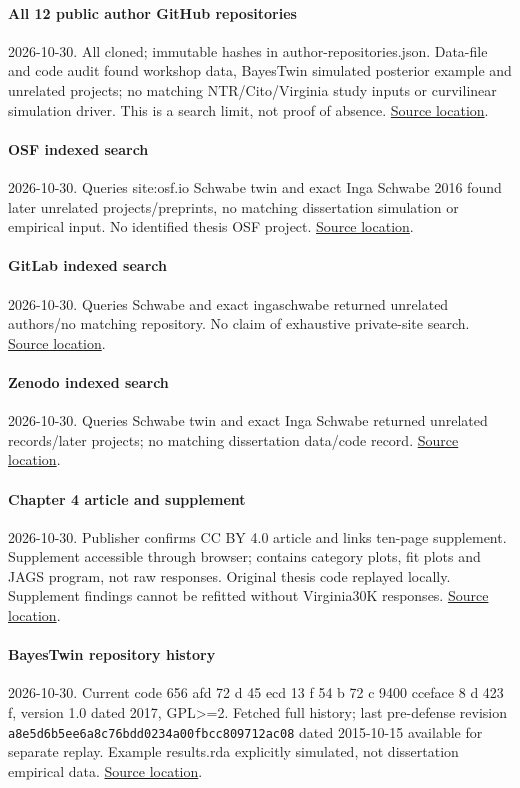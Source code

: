 \documentclass[11pt]{article}
\begin{document}
\paragraph{All 12 public author GitHub repositories} 2026-10-30. All cloned; immutable hashes in author-repositories.json. Data-file and code audit found workshop data, BayesTwin simulated posterior example and unrelated projects; no matching NTR/Cito/Virginia study inputs or curvilinear simulation driver. This is a search limit, not proof of absence. \href{https://github.com/ingaschwabe}{Source location}.
\paragraph{OSF indexed search} 2026-10-30. Queries site:osf.io Schwabe twin and exact Inga Schwabe 2016 found later unrelated projects/preprints, no matching dissertation simulation or empirical input. No identified thesis OSF project. \href{https://osf.io/}{Source location}.
\paragraph{GitLab indexed search} 2026-10-30. Queries Schwabe and exact ingaschwabe returned unrelated authors/no matching repository. No claim of exhaustive private-site search. \href{https://gitlab.com/}{Source location}.
\paragraph{Zenodo indexed search} 2026-10-30. Queries Schwabe twin and exact Inga Schwabe returned unrelated records/later projects; no matching dissertation data/code record. \href{https://zenodo.org/}{Source location}.
\paragraph{Chapter 4 article and supplement} 2026-10-30. Publisher confirms CC BY 4.0 article and links ten-page supplement. Supplement accessible through browser; contains category plots, fit plots and JAGS program, not raw responses. Original thesis code replayed locally. Supplement findings cannot be refitted without Virginia30K responses. \href{https://link.springer.com/article/10.1007/s10519-015-9768-9}{Source location}.
\paragraph{BayesTwin repository history} 2026-10-30. Current code 656 afd 72 d 45 ecd 13 f 54 b 72 c 9400 cceface 8 d 423 f, version 1.0 dated 2017, GPL>=2. Fetched full history; last pre-defense revision \nolinkurl{a8e5d6b5ee6a8c76bdd0234a00fbcc809712ac08} dated 2015-10-15 available for separate replay. Example results.rda explicitly simulated, not dissertation empirical data. \href{https://github.com/ingaschwabe/BayesTwin}{Source location}.
\end{document}
